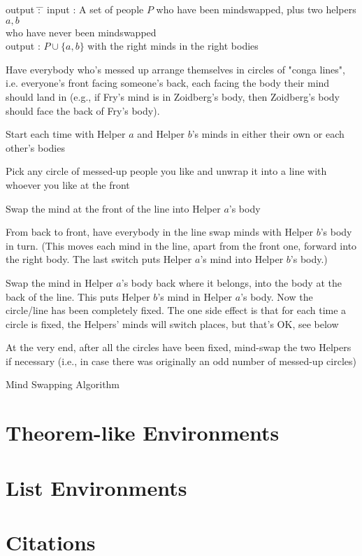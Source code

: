 \begin{algorithm} 
\begin{tabbing}
output \= : \= \kill
input \> : \> A set of people $P$ who have been mindswapped, plus two helpers $a,b$ \\
\>\>who have never been mindswapped \\
output \> : \> $P \cup \{a,b\}$ with the right minds in the right bodies \\
\end{tabbing}

\begin{algorithmic}[1]

\State Have everybody who's messed up arrange themselves in circles of "conga lines", i.e. everyone's front facing someone's back, each facing the body their mind should land in (e.g., if Fry's mind is in Zoidberg's body, then Zoidberg's body should face the back of Fry's body).


	\State Start each time with Helper $a$ and Helper $b$'s minds in either their own or each other's bodies

	\State Pick any circle of messed-up people you like and unwrap it into a line with whoever you like at the front

	\State Swap the mind at the front of the line into Helper $a$'s body

	\State From back to front, have everybody in the line swap minds with Helper $b$'s body in turn. (This moves each mind in the line, apart from the front one, forward into the right body. The last switch puts Helper $a$'s mind into Helper $b$'s body.)

	\State Swap the mind in Helper $a$'s body back where it belongs, into the body at the back of the line. This puts Helper $b$'s mind in Helper $a$'s body. Now the circle/line has been completely fixed. The one side effect is that for each time a circle is fixed, the Helpers' minds will switch places, but that's OK, see below\label{algline:swap:return}
\EndFor

\State At the very end, after all the circles have been fixed, mind-swap the two Helpers if necessary (i.e., in case there was originally an odd number of messed-up circles) 

\end{algorithmic}
\vspace{1em}
\caption{Mind Swapping Algorithm \cite{theoremofbenda}}
\label{alg:swap}
\end{algorithm}

\section{Theorem-like Environments} 

\section{List Environments} 

\section{Citations}

